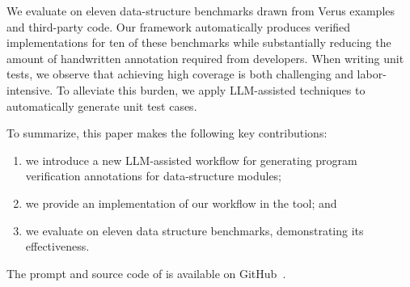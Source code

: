 


We evaluate \toolname{} on eleven data-structure benchmarks drawn from Verus examples and third-party code. Our framework automatically produces verified implementations for ten of these benchmarks while substantially reducing the amount of handwritten annotation required from developers.
When writing unit tests, we observe that achieving high coverage is both challenging and labor-intensive. To alleviate this burden, we apply LLM-assisted techniques to automatically generate unit test cases.

To summarize, this paper makes the following key contributions:
\begin{enumerate}
    \item we introduce a new LLM-assisted workflow for generating program verification annotations for data-structure modules;
    \item we provide an implementation of our workflow in the \toolname{} tool; and
    \item we evaluate \toolname{} on eleven data structure benchmarks, demonstrating its effectiveness.
\end{enumerate}

The prompt and source code of \toolname{} is available on GitHub~\cite{artifact}.

